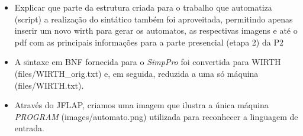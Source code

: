 
\begin{itemize}
	\item Explicar que parte da estrutura criada para o trabalho que automatiza (script) a realização do sintático também foi aproveitada, permitindo apenas inserir um novo wirth para gerar os automatos, as respectivas imagens e até o pdf com as principais informações para a parte presencial (etapa 2) da P2
	\item A sintaxe em BNF fornecida para o \emph{SimpPro} foi convertida para WIRTH (files/WIRTH\_orig.txt) e, em seguida, reduzida a uma só máquina (files/WIRTH.txt).
	\item Através do JFLAP, criamos uma imagem que ilustra a única máquina \emph{PROGRAM} (images/automato.png) utilizada para reconhecer a linguagem de entrada.
\end{itemize}
